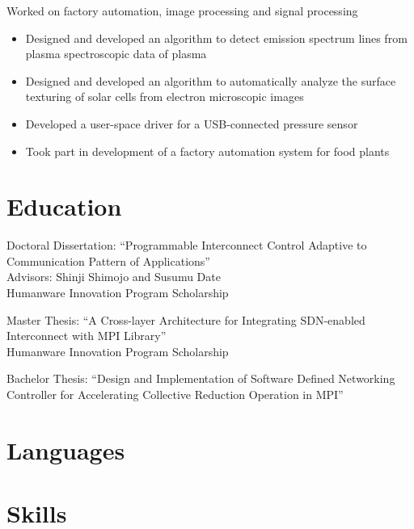 \documentclass[10pt,a4paper,sans]{moderncv}
\begin{document}
%
{Worked on factory automation, image processing and signal processing%
\begin{itemize}%
\item Designed and developed an algorithm to detect emission spectrum lines
    from plasma spectroscopic data of plasma
\item Designed and developed an algorithm to automatically analyze the
    surface texturing of solar cells from electron microscopic images
\item Developed a user-space driver for a USB-connected pressure sensor
\item Took part in development of a factory automation system for food plants
\end{itemize}}

\newpage

\section{Education}

%
{Doctoral Dissertation: ``Programmable Interconnect Control Adaptive to Communication Pattern of Applications''\\%
Advisors: Shinji Shimojo and Susumu Date\\%
Humanware Innovation Program Scholarship}

%
{Master Thesis: ``A Cross-layer Architecture for Integrating SDN-enabled
Interconnect with MPI Library''\\%
Humanware Innovation Program Scholarship}

%
{Bachelor Thesis: ``Design and Implementation of Software Defined Networking Controller for Accelerating Collective Reduction Operation in MPI''}

\section{Languages}

\section{Skills}
\end{document}
